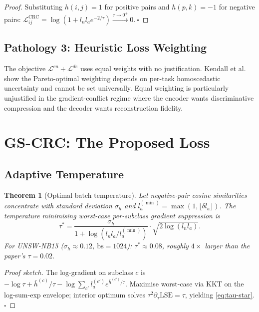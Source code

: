\documentclass[conference]{IEEEtran}
\newtheorem{theorem}{Theorem}
\begin{document}
\begin{proof}
Substituting $h(i,j)=1$ for positive pairs and $h(p,k)=-1$ for negative pairs:
$\mathcal{L}_{ij}^{\text{CRC}} = \log(1 + l_n l_a e^{-2/\tau})
\xrightarrow{\tau\to 0^+} 0.\ \square$
\end{proof}

\subsection{Pathology 3: Heuristic Loss Weighting}

The objective $\mathcal{L}^{en} + \mathcal{L}^{de}$ uses equal weights with no
justification. Kendall et al.~\cite{kendall2018multi} show the Pareto-optimal
weighting depends on per-task homoscedastic uncertainty and cannot be set
universally. Equal weighting is particularly unjustified in the gradient-conflict
regime where the encoder wants discriminative compression and the decoder
wants reconstruction fidelity.

\section{GS-CRC: The Proposed Loss}

\subsection{Adaptive Temperature}

\begin{theorem}[Optimal batch temperature]\label{thm:tau}
Let negative-pair cosine similarities concentrate with standard deviation
$\sigma_h$ and $l_a^{(\min)} = \max(1, \lfloor\delta l_a\rfloor)$.
The temperature minimising worst-case per-subclass gradient suppression is
\begin{equation}
\tau^* = \frac{\sigma_h}{1+\log\!\left(l_n l_a / l_a^{(\min)}\right)}
         \cdot\sqrt{2\log(l_n l_a)}.
\label{eq:tau-star}
\end{equation}
For UNSW-NB15 ($\sigma_h \approx 0.12$, $\mathrm{bs}=1024$):
$\tau^* \approx 0.08$, roughly $4\times$ larger than the paper's $\tau = 0.02$.
\end{theorem}

\begin{proof}[Proof sketch]
The log-gradient on subclass $c$ is
$-\log\tau + \bar{h}^{(c)}/\tau - \log\sum_{c'} l_a^{(c')} e^{\bar{h}^{(c')}/\tau}$.
Maximise worst-case via KKT on the log-sum-exp envelope;
interior optimum solves $\tau^2 \partial_\tau \mathrm{LSE} = \tau$,
yielding \eqref{eq:tau-star}. $\square$
\end{proof}
\end{document}
